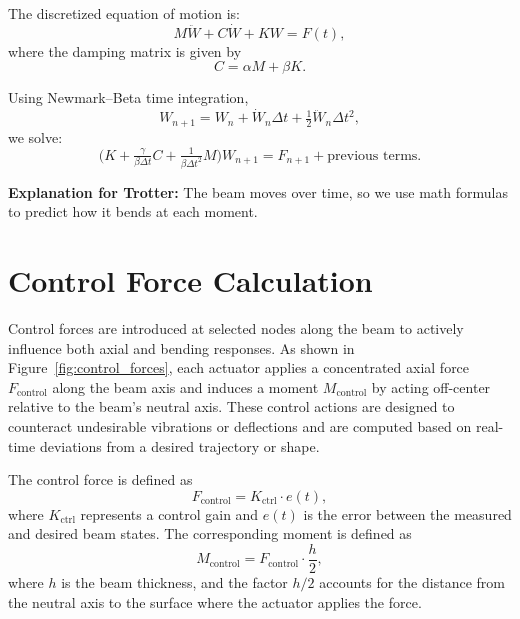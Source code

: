 \documentclass{article}
\begin{document}
	The discretized equation of motion is:
	\begin{equation}
		M \ddot{W} + C \dot{W} + K W = F(t),
	\end{equation}
	where the damping matrix is given by
	\begin{equation}
		C = \alpha M + \beta K.
	\end{equation}
	
	Using Newmark–Beta time integration,
	\begin{equation}
		W_{n+1} = W_n + \dot{W}_n \Delta t + \tfrac12 \ddot{W}_n \Delta t^2,
	\end{equation}
	we solve:
	\begin{equation}
		\bigl(K + \tfrac{\gamma}{\beta \Delta t} C + \tfrac{1}{\beta \Delta t^2} M\bigr) W_{n+1}
		= F_{n+1} + \text{previous terms}.
	\end{equation}
	
	\textbf{Explanation for Trotter:} The beam moves over time, so we use math formulas to predict how it bends at each moment.
	
	\section*{Control Force Calculation}
	Control forces are introduced at selected nodes along the beam to actively influence both axial and bending responses. As shown in Figure~\ref{fig:control_forces}, each actuator applies a concentrated axial force \( F_{\text{control}} \) along the beam axis and induces a moment \( M_{\text{control}} \) by acting off-center relative to the beam’s neutral axis. These control actions are designed to counteract undesirable vibrations or deflections and are computed based on real-time deviations from a desired trajectory or shape.
	
	The control force is defined as
	\begin{equation}
		F_{\text{control}} = K_{\text{ctrl}} \cdot e(t),
	\end{equation}
	where \( K_{\text{ctrl}} \) represents a control gain and \( e(t) \) is the error between the measured and desired beam states. The corresponding moment is defined as
	\begin{equation}
		M_{\text{control}} = F_{\text{control}} \cdot \frac{h}{2},
	\end{equation}
	where \( h \) is the beam thickness, and the factor \( h/2 \) accounts for the distance from the neutral axis to the surface where the actuator applies the force.
	
\end{document}

